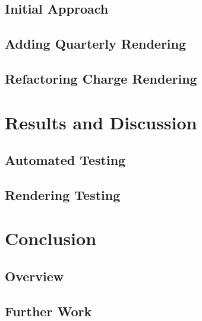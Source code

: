 \documentclass[nobib, a4paper, twoside, justified]{tufte-book}
\begin{document}
\section{Initial Approach}%
\label{sec:initial_approach}

\section{Adding Quarterly Rendering}%
\label{sec:adding_quarterly_rendering}

\section{Refactoring Charge Rendering}%
\label{sec:refactoring_charge_rendering}

\chapter{Results and Discussion}%
\label{cha:results_and_discussion}

\section{Automated Testing}%
\label{sec:automated_testing}

\section{Rendering Testing}%
\label{sec:rendering_testing}

\chapter{Conclusion}%
\label{cha:conclusion}

\section{Overview}%
\label{sec:overview}

\section{Further Work}%
\label{sec:further_work}



\backmatter

\printbibliography[heading=bibintoc]
\end{document}
